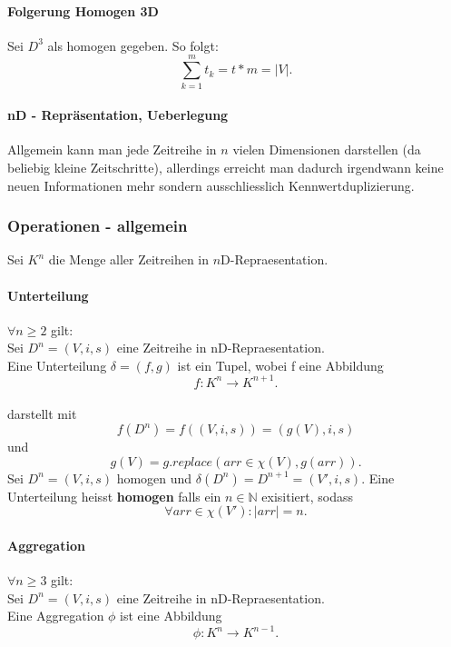 \documentclass[12pt]{article}
\begin{document}
			\paragraph{Folgerung Homogen 3D}
				Sei $D^{3}$ als homogen gegeben. So folgt:
				\begin{equation}
					\sum_{k=1}^{m}t_{k} = t*m = |V|.
				\end{equation}
				
			\paragraph{nD - Repräsentation, Ueberlegung}
				Allgemein kann man jede Zeitreihe in $n$ vielen Dimensionen darstellen (da beliebig kleine Zeitschritte), allerdings erreicht man dadurch irgendwann keine neuen Informationen mehr sondern ausschliesslich Kennwertduplizierung.
		\subsubsection{Operationen - allgemein}
			Sei $K^{n}$ die Menge aller Zeitreihen in $n$D-Repraesentation.		
		
			\paragraph{Unterteilung}
				$\forall n \geq 2$ gilt:\\
				Sei $D^{n} = (V, i, s)$ eine Zeitreihe in nD-Repraesentation.\\[0.0cm]
				Eine Unterteilung $\delta = (f, g)$ ist ein Tupel, wobei f eine Abbildung 
				\begin{equation}
					f: K^{n} \rightarrow K^{n+1}.
				\end{equation}\\[0.3cm]
				darstellt mit
				\begin{equation}
					f(D^{n}) = f ((V,i,s)) = (g(V), i, s)
				\end{equation}
				und
				\begin{equation}
					g(V) = g.replace(arr \in \chi(V), g(arr)).
				\end{equation}
				Sei $D^{n} = (V, i, s)$ homogen und $\delta(D^{n}) = D^{n+1} = (V', i, s)$.
				Eine Unterteilung heisst \textbf{homogen} falls ein $n \in \mathbb{N}$ exisitiert, sodass
				\begin{equation}
					\forall arr \in \chi(V'): |arr| = n.
				\end{equation}
				
			\paragraph{Aggregation}
				$\forall n \geq 3$ gilt:\\
				Sei $D^{n} = (V, i, s)$ eine Zeitreihe in nD-Repraesentation.\\[0.3cm]
				Eine Aggregation $\phi$ ist eine Abbildung 
				\begin{equation}
					\phi: K^{n} \rightarrow K^{n-1}.
				\end{equation}
				
\end{document}
